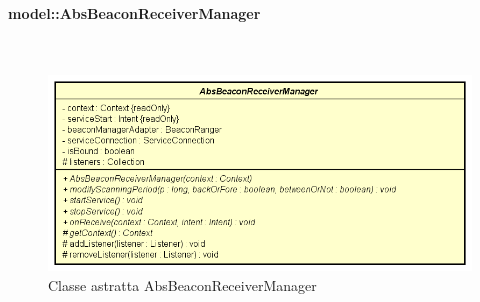 \documentclass[../DefinizioneDiProdotto.tex]{subfiles}
\begin{document}
\paragraph{model::AbsBeaconReceiverManager}
\
\begin{figure}[H]
	\centering
	\includegraphics[width=\maxwidth]{img/AbsBeaconReceiverManager.png}
	\caption{Classe astratta AbsBeaconReceiverManager}\label{fig:model::AbsBeaconReceiverManager} 
\end{figure}
\end{document}
